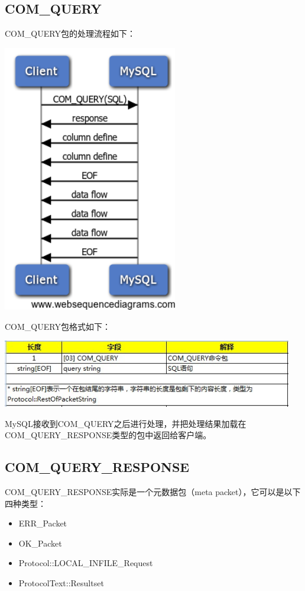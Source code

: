 \documentclass[a4paper, titlepage, 10pt, bookmark]{article}
\begin{document}
\subsection{COM\_QUERY}
COM\_QUERY包的处理流程如下：
\begin{center}
\includegraphics[width=3in]{011.png}
\end{center}

COM\_QUERY包格式如下：
\begin{center}
\includegraphics[width=5in]{012.jpg}
\end{center}

MySQL接收到COM\_QUERY之后进行处理，并把处理结果加载在COM\_QUERY\_RESPONSE类型的包中返回给客户端。

\subsection{COM\_QUERY\_RESPONSE}
COM\_QUERY\_RESPONSE实际是一个元数据包（meta packet），它可以是以下四种类型：
\begin{itemize}
    \item ERR\_Packet
    \item OK\_Packet
    \item Protocol::LOCAL\_INFILE\_Request
    \item ProtocolText::Resultset
\end{itemize}
\end{document}
